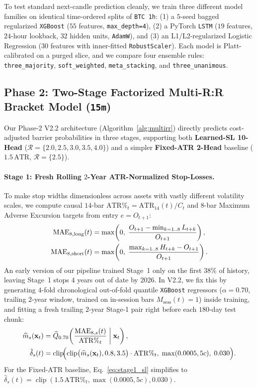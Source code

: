 \documentclass{article}
\newcommand{\ATR}{\mathrm{ATR}}
\newcommand{\MAE}{\mathrm{MAE}}
\begin{document}
To test standard next-candle prediction cleanly, we train three different model families on identical time-ordered splits of \texttt{BTC 1h}: (1) a $5$-seed bagged regularized \texttt{XGBoost} ($55$ features, \texttt{max\_depth=4}), (2) a PyTorch \texttt{LSTM} ($19$ features, $24$-hour lookback, $32$ hidden units, \texttt{AdamW}), and (3) an L1/L2-regularized Logistic Regression ($30$ features with inner-fitted \texttt{RobustScaler}). Each model is Platt-calibrated on a purged slice, and we compare four ensemble rules: \texttt{three\_majority}, \texttt{soft\_weighted}, \texttt{meta\_stacking}, and \texttt{three\_unanimous}.

\subsection{Phase 2: Two-Stage Factorized Multi-R:R Bracket Model (\texttt{15m})}

Our Phase-2 V2.2 architecture (Algorithm~\ref{alg:multirr}) directly predicts cost-adjusted barrier probabilities in three stages, supporting both \textbf{Learned-SL 10-Head} ($\mathcal{R}=\{2.0,2.5,3.0,3.5,4.0\}$) and a simpler \textbf{Fixed-ATR 2-Head} baseline ($1.5\,\ATR$, $\mathcal{R}=\{2.5\}$).

\paragraph{Stage 1: Fresh Rolling $2$-Year ATR-Normalized Stop-Losses.}
To make stop widths dimensionless across assets with vastly different volatility scales, we compute causal $14$-bar $\ATR\%_t = \ATR_{14}(t) / C_t$ and $8$-bar Maximum Adverse Excursion targets from entry $e = O_{t+1}$:
\begin{align}
  \MAE_{8,\mathrm{long}}(t) &= \max\!\left(0,\; \frac{O_{t+1} - \min_{k=1..8} L_{t+k}}{O_{t+1}}\right), \notag \\
  \MAE_{8,\mathrm{short}}(t) &= \max\!\left(0,\; \frac{\max_{k=1..8} H_{t+k} - O_{t+1}}{O_{t+1}}\right).
  \label{eq:mae}
\end{align}
An early version of our pipeline trained Stage~1 only on the first $38\%$ of history, leaving Stage~1 stops $4$ years out of date by 2026. In V2.2, we fix this by generating $4$-fold chronological out-of-fold quantile \texttt{XGBoost} regressors ($\alpha=0.70$, trailing $2$-year window, trained on in-session bars $M_{\mathrm{sess}}(t)=1$) inside training, and fitting a fresh trailing $2$-year Stage-1 pair right before each $180$-day test chunk:
\begin{align}
  \widehat{m}_s(\mathbf{x}_t) &= \widehat{Q}_{0.70}\!\left(\frac{\MAE_{8,s}(t)}{\ATR\%_t} \;\middle|\; \mathbf{x}_t\right), \notag \\
  \hat{\delta}_s(t) &= \operatorname{clip}\!\Bigl(\operatorname{clip}\bigl(\widehat{m}_s(\mathbf{x}_t), 0.8, 3.5\bigr)\cdot \ATR\%_t,\; \max(0.0005, 5c),\; 0.030\Bigr).
  \label{eq:stage1_sl}
\end{align}
For the Fixed-ATR baseline, Eq.~\eqref{eq:stage1_sl} simplifies to $\hat{\delta}_s(t) = \operatorname{clip}(1.5\,\ATR\%_t, \max(0.0005, 5c), 0.030)$.
\end{document}
